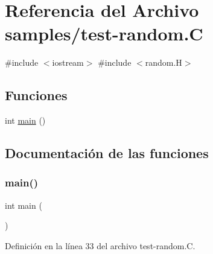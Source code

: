 \hypertarget{test-random_8_c}{}\section{Referencia del Archivo samples/test-\/random.C}
\label{test-random_8_c}
{\ttfamily \#include $<$iostream$>$}\newline
{\ttfamily \#include $<$random.\+H$>$}\newline
\subsection*{Funciones}
\begin{DoxyCompactItemize}
\item 
int \hyperlink{test-random_8_c_ae66f6b31b5ad750f1fe042a706a4e3d4}{main} ()
\end{DoxyCompactItemize}


\subsection{Documentación de las funciones}
\mbox{\label{test-random_8_c_ae66f6b31b5ad750f1fe042a706a4e3d4}} 
\subsubsection{\texorpdfstring{main()}{main()}}
{\footnotesize\ttfamily int main (\begin{DoxyParamCaption}{ }\end{DoxyParamCaption})}



Definición en la línea 33 del archivo test-\/random.\+C.

